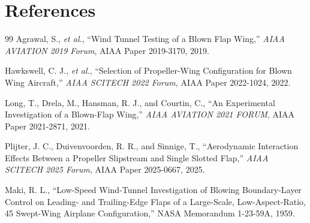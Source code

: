 \documentclass[conf]{new-aiaa}
\begin{document}
\section*{References}
\begin{thebibliography}{99}
Agrawal, S., \emph{et al.},
``Wind Tunnel Testing of a Blown Flap Wing,''
\emph{AIAA AVIATION 2019 Forum},
AIAA Paper 2019-3170,
2019.

Hawkswell, C. J., \emph{et al.},
``Selection of Propeller-Wing Configuration for Blown Wing Aircraft,''
\emph{AIAA SCITECH 2022 Forum},
AIAA Paper 2022-1024,
2022.

Long, T., Drela, M., Hansman, R. J., and Courtin, C.,
``An Experimental Investigation of a Blown-Flap Wing,''
\emph{AIAA AVIATION 2021 FORUM},
AIAA Paper 2021-2871,
2021.

Plijter, J. C., Duivenvoorden, R. R., and Sinnige, T.,
``Aerodynamic Interaction Effects Between a Propeller Slipstream and Single Slotted Flap,''
\emph{AIAA SCITECH 2025 Forum},
AIAA Paper 2025-0667,
2025.

Maki, R. L.,
``Low-Speed Wind-Tunnel Investigation of Blowing Boundary-Layer Control on Leading- and Trailing-Edge Flaps of a Large-Scale, Low-Aspect-Ratio, 45 Swept-Wing Airplane Configuration,''
NASA Memorandum 1-23-59A,
1959.
\end{thebibliography}
\end{document}
